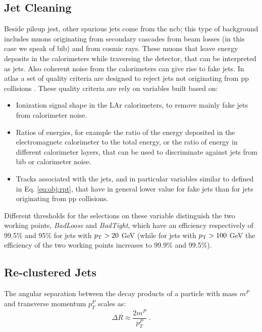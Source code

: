 \subsection{Jet Cleaning}

Beside pileup jest, other spurious jets come from the \gls{ncb}; this type of background includes muons originating from secondary cascades from beam losses (in this case we speak of \gls{bib}) and from cosmic rays. These muons that leave energy deposits in the calorimeters while traversing the detector, that can be interpreted as jets. Also coherent noise from the calorimeters can give rise to fake jets. In \gls{atlas} a set of quality criteria are designed to reject jets not originating from \gls{pp} collisions \cite{TheATLAScollaboration:2015ofz}. These quality criteria are rely on variables built based on:
\begin{itemize}
\item Ionization signal shape in the LAr calorimeters, to remove mainly fake jets from calorimeter noise. 
\item Ratios of energies, for example the ratio of the energy deposited in the electromagnetc calorimeter to the total energy, or the ratio of energy in different calorimeter layers, that can be used to discriminate against jets from \gls{bib} or calorimeter noise.
\item Tracks associated with the jets, and in particular variables similar to \RpT defined in Eq. \ref{eq:obj:rpt}, that have in general lower value for fake jets than for jets originating from \gls{pp} collisions. 
\end{itemize} 

Different thresholds for the selections on these variable distinguish the two working points, \textit{BadLoose} and \textit{BadTight}, which have an efficiency respectively of 99.5\% and 95\% for jets with $p_{\rm T} > 20$ GeV (while for jets with $p_{\rm T} > 100$ GeV the efficiency of the two working points increases to 99.9\% and 99.5\%). 

\subsection{Re-clustered Jets}

The angular separation between the decay products of a particle with mass $m^P$ and transverse momentum 
$p_T^P$ scales as:
\begin{equation}
\Delta R \approx \frac{2 m^P}{p_T^P} \; .
\end{equation}

